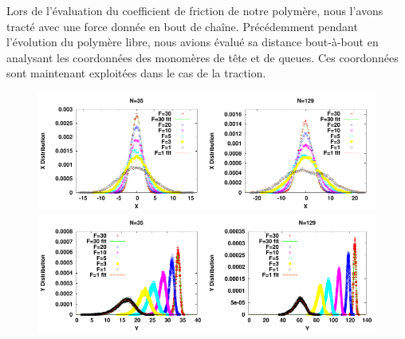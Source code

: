 Lors de l'évaluation du coefficient de friction de notre polymère, nous l'avons tracté avec une force donnée en bout de chaîne. Précédemment pendant l'évolution du polymère libre, nous avions évalué sa distance bout-à-bout en analysant les coordonnées des monomères de tête et de queues. Ces coordonnées sont maintenant exploitées dans le cas de la traction. 


\begin{figure}[H]
\begin{center}
\includegraphics[width=0.5\textwidth]{xdistribution35.pdf}\includegraphics[width=0.5\textwidth]{xdistribution129.pdf}\\
\includegraphics[width=0.5\textwidth]{ydistribution35.pdf}\includegraphics[width=0.5\textwidth]{ydistribution129.pdf}


\end{center}
\end{figure}
